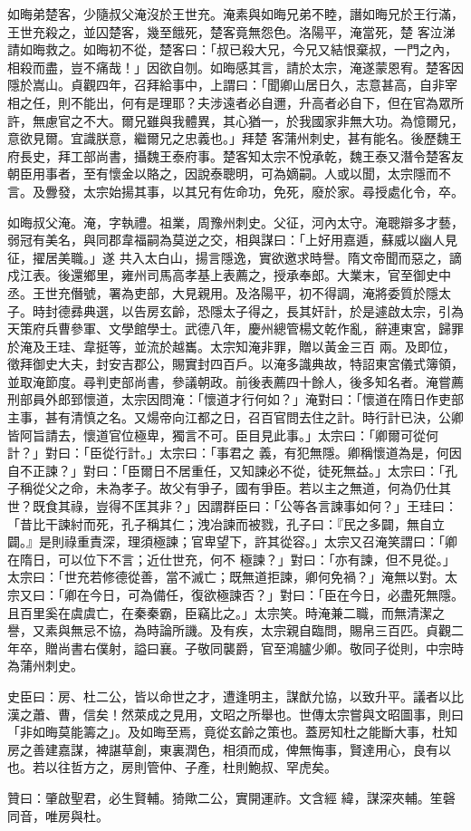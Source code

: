\begin{pinyinscope}
 如晦弟楚客，少隨叔父淹沒於王世充。淹素與如晦兄弟不睦，譖如晦兄於王行滿，王世充殺之，並囚楚客，幾至餓死，楚客竟無怨色。洛陽平，淹當死，楚
 客泣涕請如晦救之。如晦初不從，楚客曰：「叔已殺大兄，今兄又結恨棄叔，一門之內，相殺而盡，豈不痛哉！」因欲自刎。如晦感其言，請於太宗，淹遂蒙恩宥。楚客因隱於嵩山。貞觀四年，召拜給事中，上謂曰：「聞卿山居日久，志意甚高，自非宰相之任，則不能出，何有是理耶？夫涉遠者必自邇，升高者必自下，但在官為眾所許，無慮官之不大。爾兄雖與我體異，其心猶一，於我國家非無大功。為憶爾兄，意欲見爾。宜識朕意，繼爾兄之忠義也。」拜楚
 客蒲州刺史，甚有能名。後歷魏王府長史，拜工部尚書，攝魏王泰府事。楚客知太宗不悅承乾，魏王泰又潛令楚客友朝臣用事者，至有懷金以賂之，因說泰聰明，可為嫡嗣。人或以聞，太宗隱而不言。及釁發，太宗始揚其事，以其兄有佐命功，免死，廢於家。尋授處化令，卒。



 如晦叔父淹。淹，字執禮。祖業，周豫州刺史。父征，河內太守。淹聰辯多才藝，弱冠有美名，與同郡韋福嗣為莫逆之交，相與謀曰：「上好用嘉遁，蘇威以幽人見征，擢居美職。」遂
 共入太白山，揚言隱逸，實欲邀求時譽。隋文帝聞而惡之，謫戍江表。後還鄉里，雍州司馬高孝基上表薦之，授承奉郎。大業末，官至御史中丞。王世充僭號，署為吏部，大見親用。及洛陽平，初不得調，淹將委質於隱太子。時封德彞典選，以告房玄齡，恐隱太子得之，長其奸計，於是遽啟太宗，引為天策府兵曹參軍、文學館學士。武德八年，慶州總管楊文乾作亂，辭連東宮，歸罪於淹及王珪、韋挺等，並流於越巂。太宗知淹非罪，贈以黃金三百
 兩。及即位，徵拜御史大夫，封安吉郡公，賜實封四百戶。以淹多識典故，特詔東宮儀式簿領，並取淹節度。尋判吏部尚書，參議朝政。前後表薦四十餘人，後多知名者。淹嘗薦刑部員外郎郅懷道，太宗因問淹：「懷道才行何如？」淹對曰：「懷道在隋日作吏部主事，甚有清慎之名。又煬帝向江都之日，召百官問去住之計。時行計已決，公卿皆阿旨請去，懷道官位極卑，獨言不可。臣目見此事。」太宗曰：「卿爾可從何計？」對曰：「臣從行計。」太宗曰：「事君之
 義，有犯無隱。卿稱懷道為是，何因自不正諫？」對曰：「臣爾日不居重任，又知諫必不從，徒死無益。」太宗曰：「孔子稱從父之命，未為孝子。故父有爭子，國有爭臣。若以主之無道，何為仍仕其世？既食其祿，豈得不匡其非？」因謂群臣曰：「公等各言諫事如何？」王珪曰：「昔比干諫紂而死，孔子稱其仁；洩冶諫而被戮，孔子曰：『民之多闢，無自立闢。』是則祿重責深，理須極諫；官卑望下，許其從容。」太宗又召淹笑謂曰：「卿在隋日，可以位下不言；近仕世充，何不
 極諫？」對曰：「亦有諫，但不見從。」太宗曰：「世充若修德從善，當不滅亡；既無道拒諫，卿何免禍？」淹無以對。太宗又曰：「卿在今日，可為備任，復欲極諫否？」對曰：「臣在今日，必盡死無隱。且百里奚在虞虞亡，在秦秦霸，臣竊比之。」太宗笑。時淹兼二職，而無清潔之譽，又素與無忌不協，為時論所譏。及有疾，太宗親自臨問，賜帛三百匹。貞觀二年卒，贈尚書右僕射，謚曰襄。子敬同襲爵，官至鴻臚少卿。敬同子從則，中宗時為蒲州刺史。



 史臣曰：房、杜二公，皆以命世之才，遭逢明主，謀猷允協，以致升平。議者以比漢之蕭、曹，信矣！然萊成之見用，文昭之所舉也。世傳太宗嘗與文昭圖事，則曰「非如晦莫能籌之」。及如晦至焉，竟從玄齡之策也。蓋房知杜之能斷大事，杜知房之善建嘉謀，裨諶草創，東裏潤色，相須而成，俾無悔事，賢達用心，良有以也。若以往哲方之，房則管仲、子產，杜則鮑叔、罕虎矣。



 贊曰：肇啟聖君，必生賢輔。猗歟二公，實開運祚。文含經
 緯，謀深夾輔。笙磬同音，唯房與杜。



\end{pinyinscope}